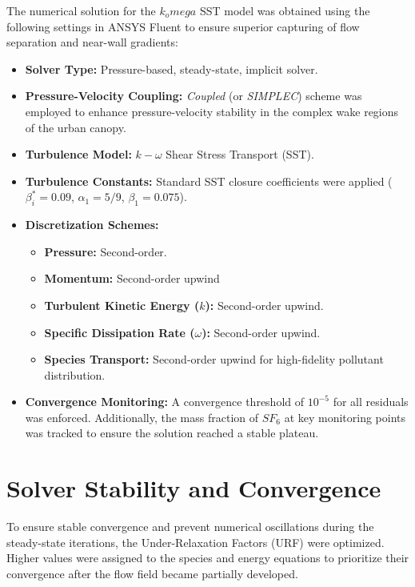 \documentclass[11pt,a4paper]{report}
\begin{document}
The numerical solution for the $k_omega$ SST model was obtained using the following settings in ANSYS Fluent to ensure superior capturing of flow separation and near-wall gradients:
\begin{itemize}
  \item \textbf{Solver Type:} Pressure-based, steady-state, implicit solver.
  \item \textbf{Pressure-Velocity Coupling:} \textit{Coupled} (or \textit{SIMPLEC}) scheme was employed to enhance pressure-velocity stability in the complex wake regions of the urban canopy.
  \item \textbf{Turbulence Model:} $k-\omega$ Shear Stress Transport (SST).
  \item \textbf{Turbulence Constants:} Standard SST closure coefficients were applied ($\beta^*_{i} = 0.09$, $\alpha_1 = 5/9$, $\beta_1 = 0.075$).
  \item \textbf{Discretization Schemes:}\begin{itemize}
  \item \textbf{Pressure:} Second-order.
  \item \textbf{Momentum:} Second-order upwind
  \item \textbf{Turbulent Kinetic Energy ($k$):} Second-order upwind.
  \item \textbf{Specific Dissipation Rate ($\omega$):} Second-order upwind.
  \item \textbf{Species Transport:} Second-order upwind for high-fidelity pollutant distribution.\end{itemize}
\item \textbf{Convergence Monitoring:} A convergence threshold of $10^{-5}$ for all residuals was enforced. Additionally, the mass fraction of $SF_6$ at key monitoring points was tracked to ensure the solution reached a stable plateau.\end{itemize}

\newpage

\section{Solver Stability and Convergence}
To ensure stable convergence and prevent numerical oscillations during the steady-state iterations, the Under-Relaxation Factors (URF) were optimized. Higher values were assigned to the species and energy equations to prioritize their convergence after the flow field became partially developed.
\end{document}
